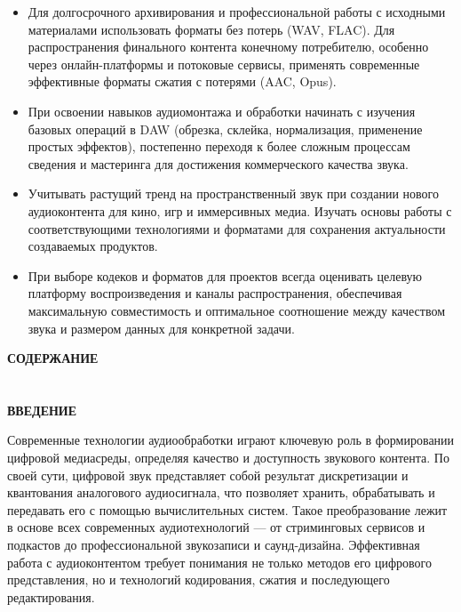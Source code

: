 \documentclass{SibFU-docs}
\begin{document}
\begin{itemize}[label=-]
    \item Для долгосрочного архивирования и профессиональной работы с исходными материалами использовать форматы без потерь (WAV, FLAC). Для распространения финального контента конечному потребителю, особенно через онлайн-платформы и потоковые сервисы, применять современные эффективные форматы сжатия с потерями (AAC, Opus).

    \item При освоении навыков аудиомонтажа и обработки начинать с изучения базовых операций в DAW (обрезка, склейка, нормализация, применение простых эффектов), постепенно переходя к более сложным процессам сведения и мастеринга для достижения коммерческого качества звука.

    \item Учитывать растущий тренд на пространственный звук при создании нового аудиоконтента для кино, игр и иммерсивных медиа. Изучать основы работы с соответствующими технологиями и форматами для сохранения актуальности создаваемых продуктов.

    \item При выборе кодеков и форматов для проектов всегда оценивать целевую платформу воспроизведения и каналы распространения, обеспечивая максимальную совместимость и оптимальное соотношение между качеством звука и размером данных для конкретной задачи.
\end{itemize}

\newpage

\thispagestyle{empty}
\begin{center}
\bfseries СОДЕРЖАНИЕ
\end{center}
\vspace{-6pt}
\tableofcontents
\clearpage

\section*{}
\vspace*{-2.5em}
\begin{center}\textbf{ВВЕДЕНИЕ}\end{center}
{}
Современные технологии аудиообработки играют ключевую роль в формировании цифровой медиасреды, определяя качество и доступность звукового контента. По своей сути, цифровой звук представляет собой результат дискретизации и квантования аналогового аудиосигнала, что позволяет хранить, обрабатывать и передавать его с помощью вычислительных систем. Такое преобразование лежит в основе всех современных аудиотехнологий — от стриминговых сервисов и подкастов до профессиональной звукозаписи и саунд-дизайна. Эффективная работа с аудиоконтентом требует понимания не только методов его цифрового представления, но и технологий кодирования, сжатия и последующего редактирования.
\end{document}
